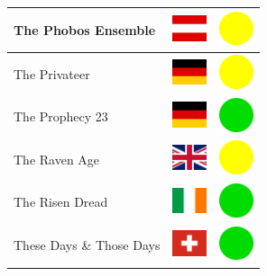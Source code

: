 \documentclass[12pt, a4paper, twoside]{report}
\begin{document}
\begin{center}
\begin{longtable}{|p{5cm}|p{2cm}|p{2cm}|}
 The Phobos Ensemble                                        & \includegraphics[width=1cm]{../img/flags/at} &   \includegraphics[width=1cm]{../likes/m} \\ \hline
 The Privateer                                              & \includegraphics[width=1cm]{../img/flags/de} &   \includegraphics[width=1cm]{../likes/m} \\ \hline
 The Prophecy 23                                            & \includegraphics[width=1cm]{../img/flags/de} &   \includegraphics[width=1cm]{../likes/y} \\ \hline
 The Raven Age                                              & \includegraphics[width=1cm]{../img/flags/gb} &   \includegraphics[width=1cm]{../likes/m} \\ \hline
 The Risen Dread                                            & \includegraphics[width=1cm]{../img/flags/ie} &   \includegraphics[width=1cm]{../likes/y} \\ \hline
 These Days \& Those Days                                   & \includegraphics[width=1cm]{../img/flags/ch} &   \includegraphics[width=1cm]{../likes/y} \\ \hline

\end{longtable}
\end{center}
\end{document}
